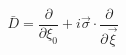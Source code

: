 \begin{equation}
\bar{D}= \frac{\partial}{\partial
\xi_{0}} + i\vec{\sigma} \cdot \frac{\partial}{\partial \vec{\xi}}
\end{equation}

